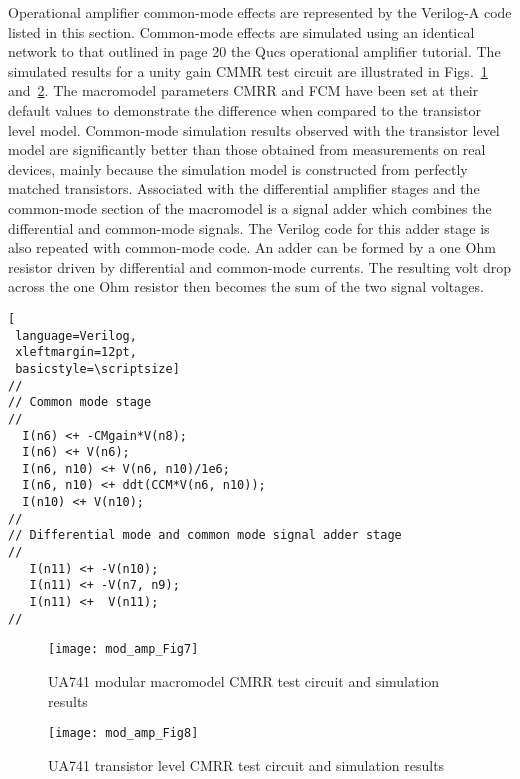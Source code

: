 Operational amplifier common-mode effects are represented by the
Verilog-A code listed in this section. Common-mode effects are
simulated using an identical network to that outlined in page 20 the
Qucs operational amplifier tutorial. The simulated results for a unity
gain CMMR test circuit are illustrated in Figs.~\ref{fig:mod_amp7}
and~\ref{fig:mod_amp8}.  The macromodel parameters CMRR and FCM have
been set at their default values to demonstrate the difference when
compared to the transistor level model. Common-mode simulation results
observed with the transistor level model are significantly better than
those obtained from measurements on real devices, mainly because the
simulation model is constructed from perfectly matched
transistors. Associated with the differential amplifier stages and the
common-mode section of the macromodel is a signal adder which combines
the differential and common-mode signals.  The Verilog code for this
adder stage is also repeated with common-mode code.  An adder can be
formed by a one Ohm resistor driven by differential and common-mode
currents. The resulting volt drop across the one Ohm resistor then
becomes the sum of the two signal voltages.


\begin{lstlisting}[
 language=Verilog, 
 xleftmargin=12pt,
 basicstyle=\scriptsize]
//
// Common mode stage
// 
  I(n6) <+ -CMgain*V(n8);
  I(n6) <+ V(n6);
  I(n6, n10) <+ V(n6, n10)/1e6;
  I(n6, n10) <+ ddt(CCM*V(n6, n10));
  I(n10) <+ V(n10);
//
// Differential mode and common mode signal adder stage
//
   I(n11) <+ -V(n10);
   I(n11) <+ -V(n7, n9);
   I(n11) <+  V(n11);
//
\end{lstlisting}

\begin{figure} [here]
  \centering
  \texttt{[image: mod\_amp\_Fig7]}
  \caption{UA741 modular macromodel CMRR test circuit and simulation results}
  \label{fig:mod_amp7}
\end{figure} 


\begin{figure} [here]
  \centering
  \texttt{[image: mod\_amp\_Fig8]}
  \caption{UA741 transistor level CMRR test circuit and simulation results}
  \label{fig:mod_amp8}
\end{figure} 



